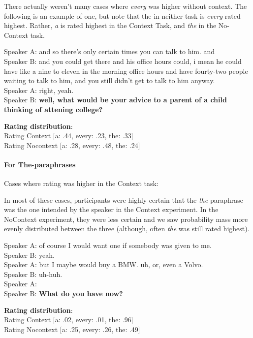 \documentclass[12pt,letterpaper,table,svgnames,dvipsnames]{article}
\begin{document}
There actually weren't many cases where \emph{every} was higher without context. The following is an example of one, but note that the in neither task is \emph{every} rated highest. Rather, \emph{a} is rated highest in the Context Task, and \emph{the} in the No-Context task.
\begin{exe}
\ex {}
    \begin{xlist}
    \ex {}
    Speaker A: and so there's only certain times you can talk to him. and\\
    Speaker B: and you could get there and his office hours could, i mean he could have like a nine to eleven in the morning office hours and have fourty-two people waiting to talk to him, and you still didn't get to talk to him anyway.\\
    Speaker A: right, yeah.\\
    Speaker B: \textbf{well, what would be your advice to a parent of a child thinking of attening college?}
    
    \ex \textbf{Rating distribution}:\\
    Rating Context [a: .44, every: .23, the: .33]\\
    Rating Nocontext [a: .28, every: .48, the: .24]
    \end{xlist}
\end{exe}




\paragraph{For The-paraphrases}

Cases where rating was higher in the Context task:

In most of these cases, participants were highly certain that the \emph{the} paraphrase was the one intended by the speaker in the Context experiment. In the NoContext experiment, they were less certain and we saw probability mass more evenly distributed between the three (although, often \emph{the} was still rated highest).

\begin{exe}
\ex {}
    \begin{xlist}
    \ex {}
    Speaker A: of course I would want one if somebody was given to me.\\
    Speaker B: yeah.\\
    Speaker A: but I maybe would buy a BMW. uh, or, even a Volvo.\\
    Speaker B: uh-huh.\\
    Speaker A: \\
    Speaker B: \textbf{What do you have now?}
    
    \ex \textbf{Rating distribution}:\\
    Rating Context [a: .02, every: .01, the: .96]\\
    Rating Nocontext [a: .25, every: .26, the: .49]
    \end{xlist}
\end{exe}
\end{document}
